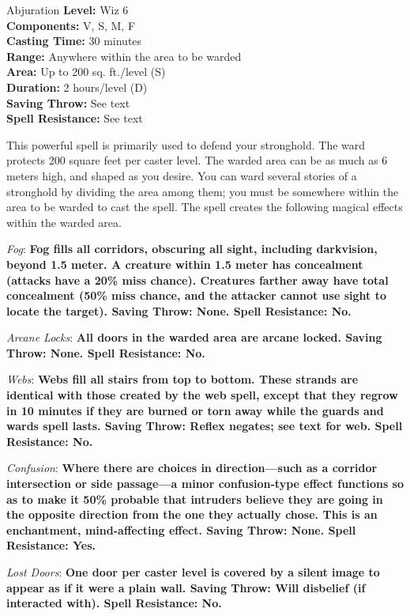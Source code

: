 {Abjuration}
{
	\textbf{Level:}
	Wiz 6\\
	\textbf{Components:}
	V, S, M, F\\
	\textbf{Casting Time:}
	30 minutes\\
	\textbf{Range:}
	Anywhere within the area to be warded\\
	\textbf{Area:}
	Up to 200 sq. ft./level (S)\\
	\textbf{Duration:}
	2 hours/level (D)\\
	\textbf{Saving Throw:}
	See text\\
	\textbf{Spell Resistance:}
	See text\\
}
{
	This powerful spell is primarily used to defend your stronghold. The ward protects 200 square feet per caster level. The warded area can be as much as 6 meters high, and shaped as you desire. You can ward several stories of a stronghold by dividing the area among them; you must be somewhere within the area to be warded to cast the spell. The spell creates the following magical effects within the warded area.

	\textit{Fog}:
	\textbf{	Fog fills all corridors, obscuring all sight, including darkvision, beyond 1.5 meter. A creature within 1.5 meter has concealment (attacks have a 20\% miss chance). Creatures farther away have total concealment (50\% miss chance, and the attacker cannot use sight to locate the target). Saving Throw: None. Spell Resistance: No.}

	\textit{Arcane Locks}:
	\textbf{	All doors in the warded area are arcane locked. Saving Throw: None. Spell Resistance: No.}

	\textit{Webs}:
	\textbf{	Webs fill all stairs from top to bottom. These strands are identical with those created by the web spell, except that they regrow in 10 minutes if they are burned or torn away while the guards and wards spell lasts. Saving Throw: Reflex negates; see text for web. Spell Resistance: No.}

	\textit{Confusion}:
	\textbf{	Where there are choices in direction---such as a corridor intersection or side passage---a minor confusion-type effect functions so as to make it 50\% probable that intruders believe they are going in the opposite direction from the one they actually chose. This is an enchantment, mind-affecting effect. Saving Throw: None. Spell Resistance: Yes.}

	\textit{Lost Doors}:
	\textbf{	One door per caster level is covered by a silent image to appear as if it were a plain wall. Saving Throw: Will disbelief (if interacted with). Spell Resistance: No.}

}
